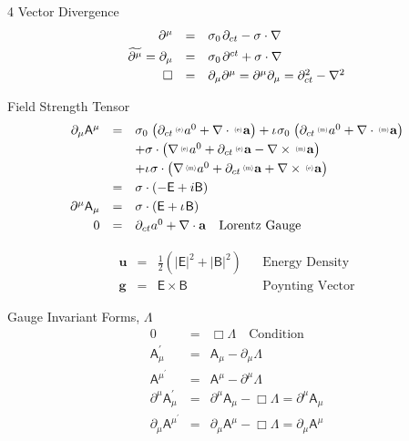 \documentclass[aps,twocolumn,secnumarabic,nobalancelastpage,amsmath,amssymb,
amsthm,nofootinbib,parskip=full]{revtex4}
\numberwithin{equation}{section}
\newcommand{\abs}[1]{\left|#1\right|}
\newcommand{\adjoint}[1]{\widetilde{#1}}
\newcommand{\iu}{\iota\mkern1mu}
\newcommand{\pauli}[1]{\sigma_#1\mkern2mu}
\newcommand{\qv}[1]{\mathbf{\mathsf{#1}}}
\newcommand{\ppv}[2]{{\,\raisebox{2pt}{\scalebox{.5}{(#1)\,}}}#2}
\newcommand{\sv}[1]{\mathbf{#1}}
\newcommand{\svl}[2]{\ppv{#1}{\sv{#2}}}
\newcommand{\ssl}[2]{\ppv{#1}{#2}}
\begin{document}
4 Vector Divergence
\begin{equation*}
\begin{array}{rcl}
\partial^\mu&=&\pauli{0}\partial_{ct}-\sigma\cdot\nabla \\[3pt]
\adjoint{\partial^\mu}=\partial_\mu&=&
               \pauli{0}\partial^{ct}+\sigma\cdot\nabla \\[3pt]
\Box&=&\partial_\mu\partial^\mu=\partial^\mu\partial_\mu=
               \partial_{ct}^2-\nabla^2
\end{array}
\end{equation*}

Field Strength Tensor
\begin{equation*}
\begin{array}{rcl}
\partial_\mu\qv{A}^\mu&=&
    \pauli{0}\left(\partial_{ct}\ssl{e}{a}^0+\nabla\cdot\svl{e}{a}\right)
    +\iu\pauli{0}\left(\partial_{ct}\ssl{m}{a}^0+\nabla\cdot\svl{m}{a}\right)
              \\[3pt]
 &&+\sigma\cdot\left(\nabla\ssl{e}{a}^0+\partial_{ct}\svl{e}{a}
                  -\nabla\times\svl{m}{a}\right) \\[3pt]
 &&+\iu\sigma\cdot\left(\nabla\ssl{m}{a}^0+\partial_{ct}\svl{m}{a}
                  +\nabla\times\svl{e}{a}\right) \\[3pt]
               &=&\sigma\cdot\left(-\qv{E}+i\qv{B}\right) \\[3pt]
\partial^\mu\qv{A}_\mu&=&
                   \sigma\cdot\left(\qv{E}+\iu\qv{B}\right) \\[3pt]
0&=&\partial_{ct}a^0+\nabla\cdot\mathbf{a}\quad\text{Lorentz Gauge}
\end{array}
\end{equation*}

\begin{equation*}
\begin{array}{rclll}
\mathbf{u}&=&\frac{1}{2}\left(\abs{\qv{E}}^2+\abs{\qv{B}}^2\right)
&&\text{Energy Density} \\[3pt]
\mathbf{g}&=&\qv{E}\times\qv{B} &&\text{Poynting Vector}
\end{array}
\end{equation*}

Gauge Invariant Forms, $\Lambda$
\begin{equation*}
\begin{array}{rcl}
  0&=&\Box\Lambda\quad\text{Condition} \\[3pt]
  \qv{A}_\mu^\prime&=&\qv{A}_\mu-\partial_\mu\Lambda \\[3pt]
  \qv{A}^\mu^\prime&=&\qv{A}^\mu-\partial^\mu\Lambda \\[3pt]
  \partial^\mu\qv{A}_\mu^\prime&=&\partial^\mu\qv{A}_\mu-\Box\Lambda
        =\partial^\mu\qv{A}_\mu\\[3pt]
  \partial_\mu\qv{A}^\mu^\prime&=&\partial_\mu\qv{A}^\mu-\Box\Lambda
        =\partial_\mu\qv{A}^\mu
\end{array}
\end{equation*}
\end{document}
